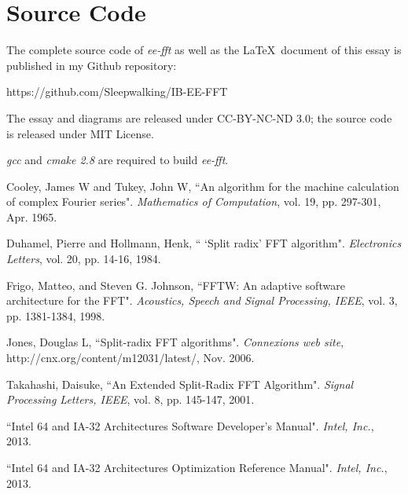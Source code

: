 \documentclass[a4paper]{report}
\begin{document}
\appendix

\chapter{Source Code} \indent

	The complete source code of \textit{ee-fft} as well as the \LaTeX \, document of this essay is published in my Github repository:
	
	\bigskip
	https://github.com/Sleepwalking/IB-EE-FFT
	\bigskip

	The essay and diagrams are released under CC-BY-NC-ND 3.0; the source code is released under MIT License.
	
	\bigskip
	
	\textit{gcc} and \textit{cmake 2.8} are required to build \textit{ee-fft}.

\clearpage
{}
\begin{thebibliography}{9}

  Cooley, James W and Tukey, John W,
  ``An algorithm for the machine calculation of complex Fourier series".
  \emph{Mathematics of Computation},
  vol. 19, pp. 297-301,
  Apr. 1965.

  Duhamel, Pierre and Hollmann, Henk,
  `` `Split radix' FFT algorithm".
  \emph{Electronics Letters},
  vol. 20, pp. 14-16,
  1984.

  Frigo, Matteo, and Steven G. Johnson,
  ``FFTW: An adaptive software architecture for the FFT".
  \emph{Acoustics, Speech and Signal Processing, IEEE},
  vol. 3, pp. 1381-1384,
  1998.

  Jones, Douglas L,
  ``Split-radix FFT algorithms".
  \emph{Connexions web site},
  http://cnx.org/content/m12031/latest/,
  Nov. 2006.

  Takahashi, Daisuke,
  ``An Extended Split-Radix FFT Algorithm".
  \emph{Signal Processing Letters, IEEE},
  vol. 8, pp. 145-147,
  2001.

  ``Intel 64 and IA-32 Architectures Software Developer’s Manual".
  \emph{Intel, Inc.},
  2013.

  ``Intel 64 and IA-32 Architectures Optimization Reference Manual".
  \emph{Intel, Inc.},
  2013.

\end{thebibliography}
\end{document}

